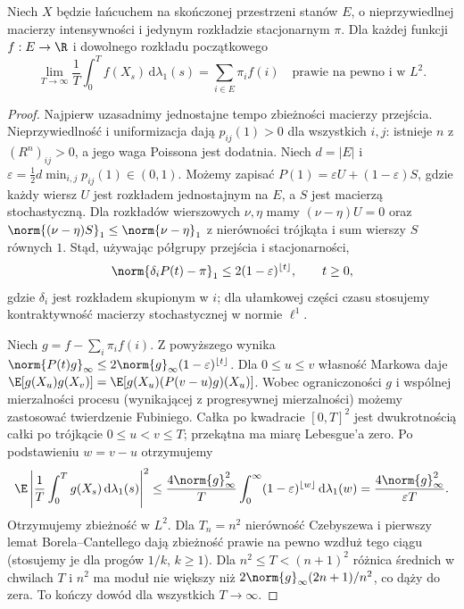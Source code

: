 \begin{twierdzenie}
Niech $X$ będzie łańcuchem na skończonej przestrzeni
stanów $E$, o nieprzywiedlnej macierzy intensywności
i jedynym rozkładzie stacjonarnym $\pi$.
Dla każdej funkcji
$f:E\to\R$ i dowolnego rozkładu początkowego
\[
\lim_{T\to\infty}\frac1T\int_0^T f(X_s)\,
\mathrm d\lambda_1(s)=\sum_{i\in E}\pi_i f(i)
\quad\text{prawie na pewno i w }L^2.
\]
\end{twierdzenie}
\begin{proof}
Najpierw uzasadnimy jednostajne tempo zbieżności
macierzy przejścia. Nieprzywiedlność i uniformizacja
dają $p_{ij}(1)>0$ dla wszystkich $i,j$: istnieje
$n$ z $(R^n)_{ij}>0$, a jego waga Poissona jest dodatnia.
Niech $d=|E|$ i
$\varepsilon=\tfrac12 d\min_{i,j}p_{ij}(1)\in(0,1)$.
Możemy zapisać $P(1)=\varepsilon U+(1-\varepsilon)S$,
gdzie każdy wiersz $U$ jest rozkładem jednostajnym
na $E$, a $S$ jest macierzą stochastyczną.
Dla rozkładów wierszowych $\nu,\eta$ mamy
$(\nu-\eta)U=0$ oraz
$\norm{(\nu-\eta)S}_1\le\norm{\nu-\eta}_1$
z nierówności trójkąta i sum wierszy $S$ równych $1$.
Stąd, używając półgrupy przejścia i stacjonarności,
\[
\norm{\delta_i P(t)-\pi}_1\le
2(1-\varepsilon)^{\lfloor t\rfloor},\qquad t\ge0,
\]
gdzie $\delta_i$ jest rozkładem skupionym w $i$;
dla ułamkowej części czasu stosujemy kontraktywność
macierzy stochastycznej w normie $\ell^1$.

Niech $g=f-\sum_i\pi_i f(i)$. Z powyższego wynika
$\norm{P(t)g}_\infty\le
2\norm{g}_\infty(1-\varepsilon)^{\lfloor t\rfloor}$.
Dla $0\le u\le v$ własność Markowa daje
$\E[g(X_u)g(X_v)]=\E[g(X_u)(P(v-u)g)(X_u)]$.
Wobec ograniczoności $g$ i wspólnej mierzalności
procesu (wynikającej z progresywnej mierzalności)
możemy zastosować twierdzenie Fubiniego.
Całka po kwadracie $[0,T]^2$ jest dwukrotnością
całki po trójkącie $0\le u<v\le T$; przekątna ma
miarę Lebesgue'a zero. Po podstawieniu $w=v-u$
otrzymujemy
\[
\E\left|\frac1T\int_0^T g(X_s)\,\mathrm d\lambda_1(s)\right|^2
\le \frac{4\norm{g}_\infty^2}{T}
\int_0^\infty(1-\varepsilon)^{\lfloor w\rfloor}
\,\mathrm d\lambda_1(w)
=\frac{4\norm{g}_\infty^2}{\varepsilon T}.
\]
Otrzymujemy zbieżność w $L^2$.
Dla $T_n=n^2$ nierówność Czebyszewa i pierwszy
lemat Borela--Cantellego dają zbieżność prawie na pewno
wzdłuż tego ciągu (stosujemy je dla progów $1/k$,
$k\ge1$). Dla $n^2\le T<(n+1)^2$ różnica średnich
w chwilach $T$ i $n^2$ ma moduł nie większy niż
$2\norm{g}_\infty(2n+1)/n^2$, co dąży do zera.
To kończy dowód dla wszystkich $T\to\infty$.
\end{proof}

